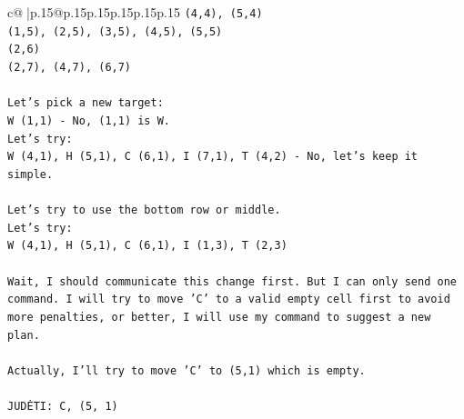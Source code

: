 \documentclass{article}
\begin{document}
{\begin{supertabular}{c@{$\;$}|p{.15\linewidth}@{}p{.15\linewidth}p{.15\linewidth}p{.15\linewidth}p{.15\linewidth}p{.15\linewidth}}
{{{\texttt{(4,4), (5,4)} \\
\texttt{(1,5), (2,5), (3,5), (4,5), (5,5)} \\
\texttt{(2,6)} \\
\texttt{(2,7), (4,7), (6,7)} \\
\\ 
\texttt{Let's pick a new target:} \\
\texttt{W (1,1) {-} No, (1,1) is W.} \\
\texttt{Let's try:} \\
\texttt{W (4,1), H (5,1), C (6,1), I (7,1), T (4,2) {-} No, let's keep it simple.} \\
\\ 
\texttt{Let's try to use the bottom row or middle.} \\
\texttt{Let's try:} \\
\texttt{W (4,1), H (5,1), C (6,1), I (1,3), T (2,3)} \\
\\ 
\texttt{Wait, I should communicate this change first. But I can only send one command. I will try to move 'C' to a valid empty cell first to avoid more penalties, or better, I will use my command to suggest a new plan.} \\
\\ 
\texttt{Actually, I'll try to move 'C' to (5,1) which is empty.} \\
\\ 
\texttt{JUDĖTI: C, (5, 1)} \\
            }
        }
    }
     \\ \\


\end{supertabular}}
\end{document}
